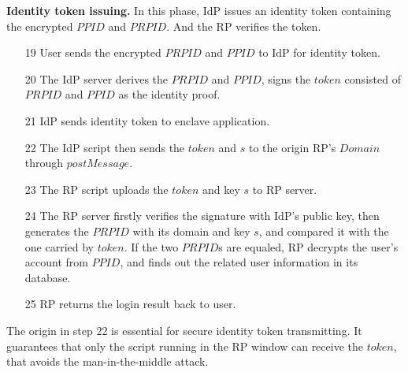 \vspace{3mm}\noindent\textbf{Identity token issuing.} In this phase, IdP issues an identity token containing the encrypted $PPID$ and $PRPID$. And the RP verifies the token.
\begin{itemize}
\item[19]User sends the encrypted $PRPID$ and $PPID$ to IdP for identity token.
\item[20]The IdP server derives the $PRPID$ and $PPID$, signs the $token$ consisted of $PRPID$ and $PPID$ as the identity proof.
\item[21]IdP sends identity token to enclave application.
\item[22]The IdP script then sends the $token$ and $s$ to the origin RP's $Domain$ through $postMessage$.
\item[23]The RP script uploads the $token$ and key $s$ to RP server.
\item[24]The RP server firstly verifies the signature with IdP's public key, then generates the $PRPID$ with its domain and key $s$, and compared it with the one carried by $token$. If the two $PRPID$s are equaled, RP decrypts the user's account from $PPID$, and finds out the related user information in its database.
\item[25]RP returns the login result back to user.
\end{itemize} 
The origin in step 22 is essential for secure identity token transmitting.
It guarantees that only the script running in the RP window can receive the $token$, that avoids the man-in-the-middle attack.

